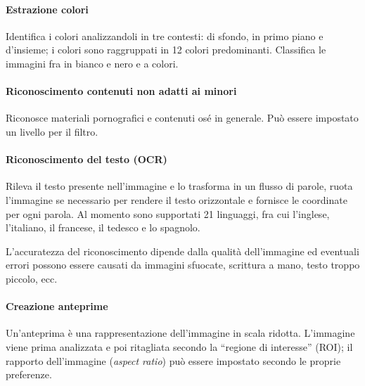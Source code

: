 \paragraph{Estrazione colori} Identifica i colori analizzandoli in tre contesti: di sfondo, in primo piano e d'insieme; i colori sono raggruppati in 12 colori predominanti. Classifica le immagini fra in bianco e nero e a colori.

\paragraph{Riconoscimento contenuti non adatti ai minori} Riconosce materiali pornografici e contenuti osé in generale. Può essere impostato un livello per il filtro.

\paragraph{Riconoscimento del testo (OCR)} Rileva il testo presente nell'immagine e lo trasforma in un flusso di parole, ruota l'immagine se necessario per rendere il testo orizzontale e fornisce le coordinate per ogni parola. Al momento sono supportati 21 linguaggi, fra cui l'inglese, l'italiano, il francese, il tedesco e lo spagnolo.

L'accuratezza del riconoscimento dipende dalla qualità dell'immagine ed eventuali errori possono essere causati da immagini sfuocate, scrittura a mano, testo troppo piccolo, ecc.

\paragraph{Creazione anteprime} Un'anteprima è una rappresentazione dell'immagine in scala ridotta. L'immagine viene prima analizzata e poi ritagliata secondo la ``regione di interesse'' (ROI); il rapporto dell'immagine (\textit{aspect ratio}) può essere impostato secondo le proprie preferenze.

